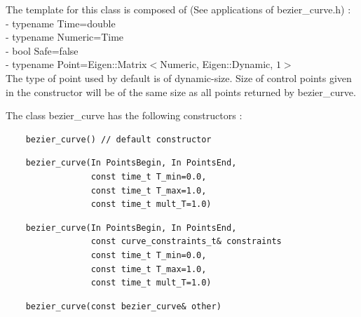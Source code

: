 \documentclass{article}
\begin{document}
    The template for this class is composed of (See applications of bezier\_curve.h) :\\ 
    - typename Time=double\\
    - typename Numeric=Time\\
    - bool Safe=false\\
    - typename Point=Eigen::Matrix$<$Numeric, Eigen::Dynamic, $1>$\\
    The type of point used by default is of dynamic-size. Size of control points given in the constructor will be of the same size as all points returned by bezier\_curve.
    
    \noindent
    The class bezier\_curve has the following constructors :
    
    \begin{lstlisting}
    bezier_curve() // default constructor
    \end{lstlisting}
    
    \begin{lstlisting}
    bezier_curve(In PointsBegin, In PointsEnd, 
                 const time_t T_min=0.0, 
                 const time_t T_max=1.0, 
                 const time_t mult_T=1.0)
    \end{lstlisting}
    
    \begin{lstlisting}
    bezier_curve(In PointsBegin, In PointsEnd,
                 const curve_constraints_t& constraints
                 const time_t T_min=0.0, 
                 const time_t T_max=1.0, 
                 const time_t mult_T=1.0)
    \end{lstlisting}
    
    \begin{lstlisting}
    bezier_curve(const bezier_curve& other)
    \end{lstlisting}
    
\end{document}
